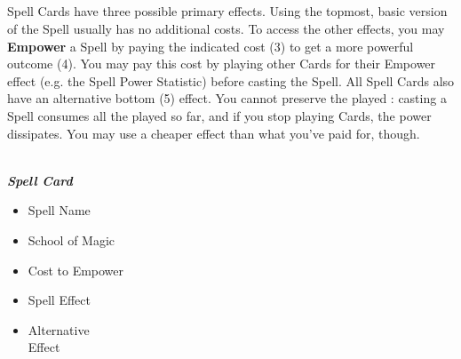 \clearpage
\begin{multicols*}{2}
\subsection*{}

Spell Cards have three possible primary effects.
Using the topmost, basic version of the Spell usually has no additional costs.
To access the other effects, you may \textbf{Empower} a Spell by paying the indicated cost (3) to get a more powerful outcome (4).
You may pay this cost by playing other Cards for their Empower  effect (e.g. the Spell Power Statistic) before casting the Spell.
All Spell Cards also have an alternative bottom (5)  effect.
You cannot preserve the played : casting a Spell consumes all the  played so far, and if you stop playing Cards, the power dissipates.
You may use a cheaper  effect than what you've paid for, though.\par

{
  \centering
  \\
  \medskip
  \footnotesize
  \textbf{\textit{\textcolor{darkcandyapplered}{Spell Card}}}\par

  \noindent
  \begin{minipage}[t]{0.5\linewidth}
    \begin{itemize}[itemsep=0pt, parsep=5pt, topsep=0pt, partopsep=0pt]
      \item[\textbf{1.}] Spell Name
      \item[\textbf{2.}] School of Magic
      \item[\textbf{3.}] Cost to Empower
    \end{itemize}
  \end{minipage}
  \begin{minipage}[t]{0.4\linewidth}
    \begin{itemize}[itemsep=0pt, parsep=5pt, topsep=0pt, partopsep=0pt]
      \item[\textbf{4.}] Spell Effect
      \item[\textbf{5.}] Alternative\\Effect
    \end{itemize}
  \end{minipage}
}
\medskip


\end{multicols*}
